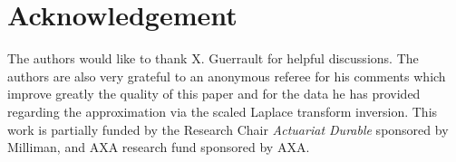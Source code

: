 \section*{Acknowledgement}
The authors would like to thank X. Guerrault for helpful discussions. The authors are also very grateful to an anonymous referee for his comments which improve greatly the quality of this paper and for the data he has provided regarding the approximation via the scaled Laplace transform inversion. This work is partially funded by the Research Chair {\it Actuariat Durable} sponsored by Milliman, and AXA research fund sponsored by AXA.


